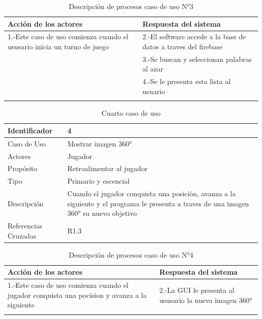 \begin{longtable}[H]{| m{8cm} | m{8cm} |}
\hline 
\textbf{Acción de los actores} & \textbf{Respuesta del sistema}\\
\hline 
1.-Este caso de uso comienza cuando el ususario inicia un turno de juego & 2.-El software accede a la base de datos a traves del firebase\\
\hline
& 3.-Se buscan y seleccionan palabras al azar\\
\hline
& 4.-Se le presenta esta lista al usuario\\
\hline
\caption{Descripción de procesos caso de uso N°3}
\end{longtable}

\begin{table}[H]
    \begin{center}
        \begin{tabular}{| l | m{12cm} |}        
        	\hline 
        	Identificador & 4\\
        	\hline
        	Caso de Uso & Mostrar imagen 360°\\
        	\hline
        	Actores & Jugador\\
        	\hline
        	Propósito & Retroalimentar al jugador \\
        	\hline
        	Tipo & Primario y escencial\\
        	\hline
        	Descripción & Cuando el jugador conquista una posición, avanza a la siguiente y el programa le presenta a traves de una imagen 360° su nuevo objetivo\\
        	\hline
        	Referencias Cruzadas & R1.3\\
        	\hline
        \end{tabular}
    \caption{Cuarto caso de uso}
    \end{center}
\end{table}

\begin{longtable}[H]{| m{8cm} | m{8cm} |}
\hline 
\textbf{Acción de los actores} & \textbf{Respuesta del sistema}\\
\hline 
1.-Este caso de uso comienza cuando el jugador conquista una pocision y avanza a la siguiente & 2.-La GUI le presenta al ususario la nueva imagen 360°\\
\hline 
\caption{Descripción de procesos caso de uso N°4}
\end{longtable}


